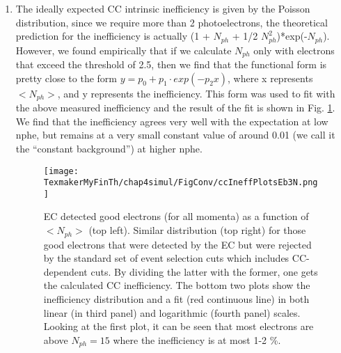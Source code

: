 \begin{enumerate}
\item  The ideally expected CC intrinsic inefficiency is given by the %
Poisson distribution, since we require more than 2 photoelectrons, the theoretical prediction for the inefficiency is actually (1 + $N_{ph}$ + 1/2 $N_{ph}^2$)*exp(-$N_{ph}$). %
However, we found empirically that if we calculate $N_{ph}$ only with electrons that exceed the threshold of 2.5, then we find that the functional form is pretty close to the form $y = p_0 + p_1 \cdot exp(-p_2 x)$, where x represents $<N_{ph}>$, and y represents the inefficiency. This form was used to fit with the above measured inefficiency and the result of the fit is shown in Fig.  \ref{figccInefFits}. We find that %
the inefficiency agrees very well with the expectation at low nphe, but remains at a very small constant value of around 0.01 (we call it the ``constant background'') at higher nphe. 




\begin{figure}[H] %
  \leavevmode \texttt{[image: TexmakerMyFinTh/chap4simul/FigConv/ccIneffPlotsEb3N.png]} 
  \caption[Calculated CC-inefficiency]{EC detected good electrons (for all momenta) as a function of $<N_{ph}>$ (top left). Similar distribution (top right) for those good electrons that were detected by the EC but were rejected by the standard set of event selection cuts which includes CC-dependent cuts. By dividing the latter with the former, one gets the calculated CC inefficiency. The bottom two plots show the inefficiency distribution and a fit (red continuous line) in both linear (in third panel) and logarithmic (fourth panel) scales. Looking at the first plot, it can be seen that most electrons are above $N_{ph}=15$ where the inefficiency is at most 1-2 \%.}
  \label{figccInefFits}
\end{figure}


\end{enumerate}
